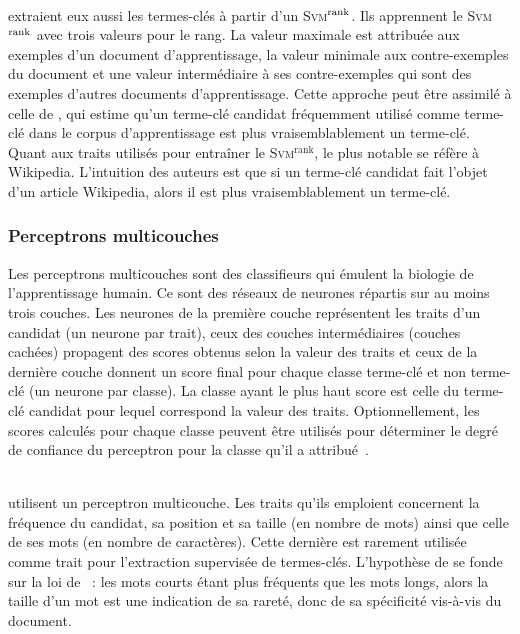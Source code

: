         ~\\ extraient eux aussi les termes-clés à
        partir d'un \textsc{Svm}$^\textnormal{rank}$. Ils apprennent le
        \textsc{Svm}$^\textnormal{rank}$ avec trois valeurs pour le rang. La
        valeur maximale est attribuée aux exemples d'un document
        d'apprentissage, la valeur minimale aux contre-exemples du document et
        une valeur intermédiaire à ses contre-exemples qui sont des exemples
        d'autres documents d'apprentissage. Cette approche peut être assimilé à
        celle de , qui estime qu'un terme-clé
        candidat fréquemment utilisé comme terme-clé dans le corpus
        d'apprentissage est plus vraisemblablement un terme-clé. Quant aux
        traits utilisés pour entraîner le \textsc{Svm}$^\text{rank}$, le plus
        notable se réfère à Wikipedia. L'intuition des auteurs est que si un
        terme-clé candidat fait l'objet d'un article Wikipedia, alors il est
        plus vraisemblablement un terme-clé.

      \subsubsection{Perceptrons multicouches}
      \label{subsubsec:main-state_of_the_art-automatic_keyphrase_extraction-supervised_keyphrase_extraction-neural_network}
        Les perceptrons multicouches sont des classifieurs qui émulent la
        biologie de l'apprentissage humain. Ce sont des réseaux de neurones
        répartis sur au moins trois couches. Les neurones de la première couche
        représentent les traits d'un candidat (un neurone par trait), ceux des
        couches intermédiaires (couches cachées) propagent des scores obtenus
        selon la valeur des traits et ceux de la dernière couche donnent un
        score final pour chaque classe \og{}terme-clé\fg{} et \og{}non
        terme-clé\fg{} (un neurone par classe). La classe ayant le plus haut
        score est celle du terme-clé candidat pour lequel correspond la valeur
        des traits. Optionnellement, les scores calculés pour chaque classe
        peuvent être utilisés pour déterminer le degré de confiance du
        perceptron pour la classe qu'il a
        attribué~\cite{denker1991neuralnetprobability}.
        
        ~\\ utilisent un perceptron
        multicouche. Les traits qu'ils emploient concer\-nent la fréquence du
        candidat, sa position et sa taille (en nombre de mots) ainsi que celle
        de ses mots (en nombre de caractères). Cette dernière est rarement
        utilisée comme trait pour l'extraction supervisée de termes-clés.
        L'hypothèse de  se fonde sur la loi de
        ~: les mots courts étant plus fréquents que les
        mots longs, alors la taille d'un mot est une indication de sa rareté,
        donc de sa spécificité vis-à-vis du document.
        
